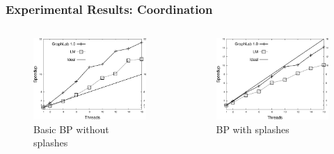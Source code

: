 \documentclass{beamer}
\begin{document}
\begin{frame}[fragile]
   \frametitle{Experimental Results: Coordination}
   \begin{columns}
      \begin{figure}[b]
         \includegraphics[width=\textwidth]{coord/speedup_bp-graphlab-400.pdf}
         \caption{Basic BP without splashes\newline\newline}
      \end{figure}
      \begin{figure}[b]
         \includegraphics[width=\textwidth]{coord/speedup2_bp-graphlab-400.pdf}
         \caption{BP with splashes\newline\newline}

\end{figure}
\end{columns}
\end{frame}
\end{document}
